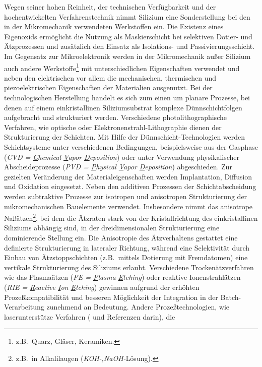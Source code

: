 Wegen seiner hohen Reinheit, der technischen Verfügbarkeit und der
hochentwickelten Verfahrenstechnik nimmt Silizium eine Sonderstellung
bei den in der Mikromechanik verwendeten Werkstoffen ein. Die Existenz
eines Eigenoxids ermöglicht die Nutzung als Maskierschicht bei
selektiven Dotier- und Ätzprozessen und zusätzlich den Einsatz als
Isolations- und Passivierungsschicht. Im Gegensatz zur Mikroelektronik
werden in der Mikromechanik außer Silizium auch andere
Werkstoffe\footnote{z.B.\ Quarz, Gläser, Keramiken.} mit
unterschiedlichen Eigenschaften
verwendet und neben den elektrischen vor allem die mechanischen,
thermischen und piezoelektrischen Eigenschaften der
Materialien ausgenutzt. Bei der technologischen Herstellung handelt es
sich zum einen um planare Prozesse, bei denen auf einem
einkristallinen Siliziumsubstrat komplexe Dünnschichtfolgen aufgebracht
und strukturiert werden. Verschiedene photolithographische Verfahren,
wie optische oder Elektronenstrahl-Lithographie dienen der Strukturierung
der Schichten. Mit Hilfe der Dünnschicht-Technologien werden Schichtsysteme
unter verschiedenen Bedingungen, beispielsweise aus der Gasphase ({\em CVD
= \underline{C}hemical \underline{V}apor \underline{D}eposition})
oder unter Verwendung physikalischer Abscheideprozesse
({\em PVD = \underline{P}hysical \underline{V}apor
\underline{D}eposition}) abgeschieden. Zur
gezielten Veränderung der Materialeigenschaften werden Implantation,
Diffusion und Oxidation eingesetzt.  Neben den additiven Prozessen der
Schichtabscheidung werden subtraktive Prozesse zur isotropen und
anisotropen Strukturierung der mikromechanischen Bauelemente verwendet.
Insbesondere nimmt das anisotrope Naßätzen\footnote{z.B.\ in Alkalilaugen
({\em KOH-,NaOH-}Lösung).}, bei dem die Ätzraten stark von der
Kristallrichtung des einkristallinen Siliziums abhängig sind, in der
dreidimensionalen Strukturierung eine dominierende Stellung ein. Die
Anisotropie des Ätzverhaltens gestattet eine definierte Strukturierung
in lateraler
Richtung, während eine Selektivität durch Einbau von Ätzstoppschichten
(z.B.\ mittels Dotierung mit Fremdatomen) eine vertikale Strukturierung des
Siliziums erlaubt. Verschiedene Trockenätzverfahren wie das Plasmaätzen
({\em PE = \underline{P}lasma \underline{E}tching}) oder reaktive
Ionenstrahlätzen ({\em RIE = \underline{R}eactive \underline{I}on
\underline{E}tching}) gewinnen aufgrund der erhöhten Prozeßkompatibilität
und besseren Möglichkeit der Integration in der
Batch-Verarbeitung zunehmend an Bedeutung. Andere Prozeßtechnologien,
wie laserunterstütze Verfahren (\cite{Ala92a} und Referenzen darin), die
